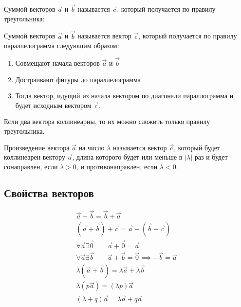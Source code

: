 \begin{definition}
  Суммой векторов $\vec{a}$ и $\vec{b}$ называется $\vec{c}$, который получается по правилу треугольника:
\end{definition}

\begin{definition}
  Суммой векторов $$ и $$ называется вектор $$, который получается по правилу параллелограмма следующим образом:
  \begin{enumerate}
    \item Совмещают начала векторов $$ и $$
    \item Достраивают фигуры до параллелограмма
    \item Тогда вектор, идущий из начала вектором по диагонали параллограмма и будет исходным вектором $$.
  \end{enumerate}
\end{definition}

\begin{note}
  Если два вектора коллинеарны, то их можно сложить только правилу треугольника.
\end{note}

\begin{definition}
  Произведение вектора $$ на число $\lambda$ называется вектор $$, который будет коллинеарен вектору $$, длина которого будет или меньше в $|\lambda|$ раз и будет сонаправлен, если $\lambda > 0$, и противонаправлен, если $\lambda < 0$.
\end{definition}

\subsection{Свойства векторов}
\begin{gather}
  \vec{a} + \vec{b} = \vec{b} + \vec{a} \\
  (\vec{a} + \vec{b}) + \vec{c} = \vec{a} + (\vec{b} + \vec{c}) \\
  \forall \vec{a} \exists \vec{0} \qquad \vec{a} + \vec{0} = \vec{a} \\
  \forall \vec{a} \exists \vec{b} \qquad \vec{a} + \vec{b} = \vec{0} \implies -\vec{b} = \vec{a} \\
  \lambda\left( \vec{a} + \vec{b} \right) = \lambda \vec{a} + \lambda \vec{b} \\
  \lambda(p \vec{a}) = \left( \lambda p \right) \vec{a} \\
  \left( \lambda  + q\right) \vec{a} = \lambda \vec{a} + q \vec{a}
\end{gather}

